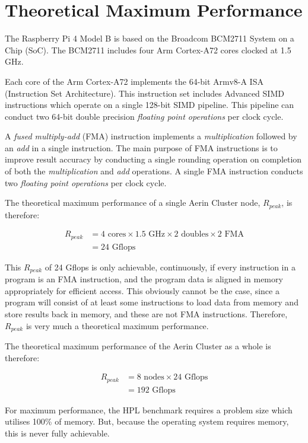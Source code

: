 %
%
\section{Theoretical Maximum Performance}

The Raspberry Pi 4 Model B is based on the Broadcom BCM2711 System on a Chip (SoC). The BCM2711 includes four Arm Cortex-A72 cores clocked at 1.5 GHz.

Each core of the Arm Cortex-A72 implements the 64-bit Armv8-A ISA (Instruction Set Architecture). This instruction set includes Advanced SIMD instructions which operate on a single 128-bit SIMD pipeline. This pipeline can conduct two 64-bit double precision \emph{floating point operations} per clock cycle.  

A \emph{fused multiply-add} (FMA) instruction implements a \emph{multiplication} followed by an \emph{add} in a single instruction. The main purpose of FMA instructions is to improve result accuracy by conducting a single rounding operation on completion of both the \emph{multiplication} and \emph{add} operations. A single FMA instruction conducts two \emph{floating point operations} per clock cycle. 

The theoretical maximum performance of a single Aerin Cluster node, $R_{peak}$, is therefore:

\begin{align}
R_{peak} &= 4 \textrm{ cores} \times 1.5 \textrm{ GHz} \times 2 \textrm{ doubles} \times 2 \textrm{ FMA}\\
&= 24 \textrm{ Gflops}
\end{align}

This $R_{peak}$ of 24 Gflops is only achievable, continuously, if every instruction in a program is an FMA instruction, and the program data is aligned in memory appropriately for efficient access. This obviously cannot be the case, since a program will consist of at least some instructions to  load data from memory and store results back in memory, and these are not FMA instructions. Therefore, $R_{peak}$ is very much a theoretical maximum performance. 

The theoretical maximum performance of the Aerin Cluster as a whole is therefore:

\begin{align}
R_{peak} &= 8 \textrm{ nodes} \times 24 \textrm{ Gflops}\\
&= 192 \textrm{ Gflops}
\end{align}

For maximum performance, the HPL benchmark requires a problem size which utilises 100\% of memory. But, because the operating system requires memory, this is never fully achievable. 

